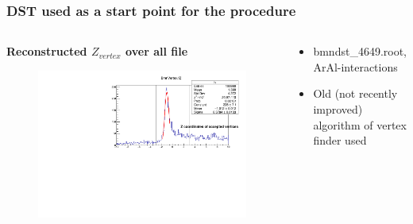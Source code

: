 \documentclass[dvipsnames] {beamer}
\begin{document}
       
      \begin{frame}
        \frametitle{\bf \centering DST used as a start point for the procedure}
        \begin{columns}[t]
          \begin{block}{\bf \centering Reconstructed $Z_{vertex}$ over all file}
            \begin{figure}[H]
              \includegraphics[width=1.\linewidth]{EmbeddingVertexZAll.pdf}
            \end{figure}
          \end{block}
          \begin{block}{}
            \bf
            \begin{itemize}
            \item bmndst\_4649.root, ArAl-interactions
            \item {\color{red} Old (not recently improved) algorithm of vertex finder used}
            \end{itemize}
          \end{block}
          

\end{columns}
\end{frame}
\end{document}
